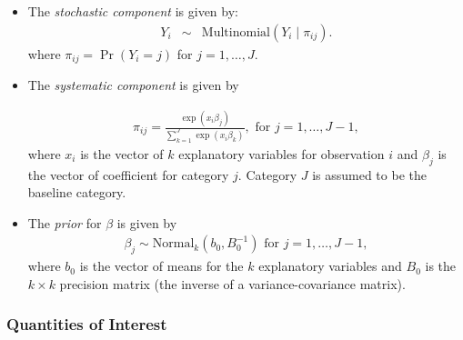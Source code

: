 \begin{itemize}
\item The \emph{stochastic component} is given by:
\begin{eqnarray*}
Y_{i} &\sim& \textrm{Multinomial}(Y_i \mid \pi_{ij}).
\end{eqnarray*}
where $\pi_{ij}=\Pr(Y_i=j)$ for $j=1, \ldots, J$.

\item The \emph{systematic component} is given by

\begin{eqnarray*}
\pi_{ij}=\frac{\exp(x_i\beta_j)}{\sum_{k=1}^J \exp(x_i\beta_k)},
\textrm{ for } j=1,\ldots, J-1,
\end{eqnarray*}
where $x_{i}$ is the vector of $k$ explanatory variables for
observation $i$ and $\beta_j$ is the vector of coefficient for
category $j$. Category $J$ is assumed to be the baseline category.

\item The \emph{prior} for $\beta$ is given by
\begin{eqnarray*}
\beta_j \sim \textrm{Normal}_k\left(  b_{0},B_{0}^{-1}\right) 
\textrm{ for } j = 1, \ldots, J-1,
\end{eqnarray*}
where $b_{0}$ is the vector of means for the $k$ explanatory variables
and $B_{0}$ is the $k \times k$ precision matrix (the inverse of a
variance-covariance matrix).
\end{itemize}

\subsubsection{Quantities of Interest}

